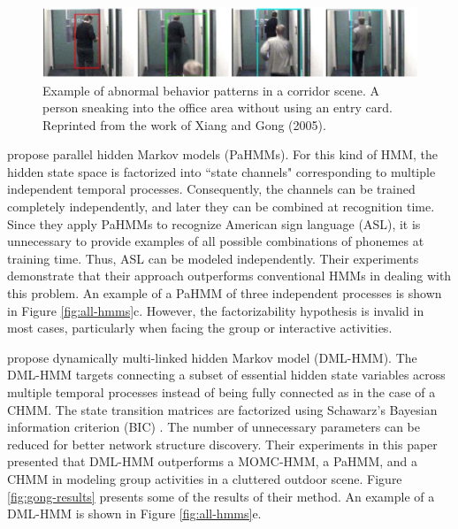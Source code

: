 \begin{figure}[t]
  \begin{center}
    \includegraphics[width=5in]{figures/xiang-sneaking-result.png}    
     \caption[Example of abnormal behavior patterns in a corridor
	scene]{Example of abnormal behavior patterns in a corridor
	scene. A person sneaking into the office area without using an
	entry card.  Reprinted from the work of Xiang and Gong
	(2005).}
    \label{fig:xiang-sneaking-result}
  \end{center}
\end{figure}

 propose parallel hidden Markov models
(PaHMMs). For this kind of HMM, the hidden state space is factorized
into ``state channels" corresponding to multiple independent temporal
processes. Consequently, the channels can be trained completely
independently, and later they can be combined at recognition
time. Since they apply PaHMMs to recognize American sign language
(ASL), it is unnecessary to provide examples of all possible
combinations of phonemes at training time. Thus, ASL can be modeled
independently. Their experiments demonstrate that their approach
outperforms conventional HMMs in dealing with this problem. An example
of a PaHMM of three independent processes is shown
in Figure \ref{fig:all-hmms}c. However, the factorizability
hypothesis is invalid in most cases, particularly when facing the
group or interactive activities.

 propose dynamically multi-linked
hidden Markov model (DML-HMM). The DML-HMM targets connecting a subset
of essential hidden state variables across multiple temporal processes
instead of being fully connected as in the case of a CHMM. The state
transition matrices are factorized using Schawarz's Bayesian
information criterion (BIC) . The number of
unnecessary parameters can be reduced for better network structure
discovery. Their experiments in this paper presented that DML-HMM
outperforms a MOMC-HMM, a PaHMM, and a CHMM in modeling group
activities in a cluttered outdoor scene. Figure \ref{fig:gong-results}
presents some of the results of their method. An example of a DML-HMM
is shown in Figure \ref{fig:all-hmms}e.

